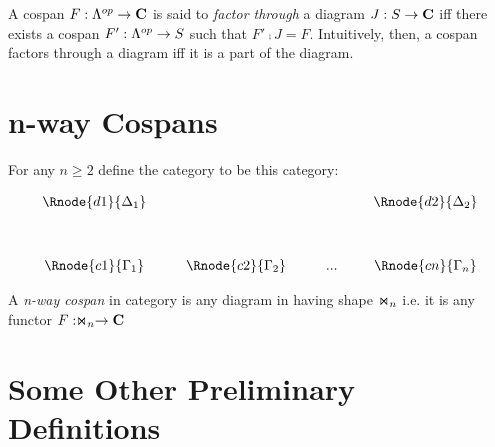 \documentclass[10pt,a4paper]{scrartcl}
\newcommand{\ndidlycospan}{n-way cospan}
\begin{document}
\vspace*{0.3cm}
\noindent
A cospan $F:\Lambda^{op} \rightarrow \textbf{C}$ is said to \textit{factor through}  a diagram 
$J:S \rightarrow \textbf{C}$ iff there exists a cospan $F': \Lambda^{op} \rightarrow S$ 
such that $F' \comp J = F$. Intuitively, then, a cospan factors through a diagram iff it is a 
part of the diagram.
  
\section{n-way Cospans}
\iffalse
The notion of a \textit{higher cospan} was
 introduced in \cite{Grandis2007} for diagrams
in a category of shape $\Lambda^{op^n}$but for us there are significant diagrams whose 
shape category is a quotient of  ${\Lambda^{op}}^n$ and since we are not aware
of further terminology in this area we introduce some here. It is appropriate to make use the join symbol ($\Join$) from relational algebra. \\
\fi

\noindent For any $n \geq 2$ define the category \ndidly to be this category:

\begin{center}
\begin{displaymath}
\begin{array}{cp{0.3cm}c         p{0.3cm}  c p{0.2cm} c}
\Rnode{d1}{\Delta_1}& &               & &     & &\Rnode{d2}{\Delta_2}  \\ [1.2cm]
\Rnode{c1}{\Gamma_1}& &\Rnode{c2}{\Gamma_2}& & ... & &\Rnode{cn}{\Gamma_n}
\end{array}
\end{displaymath}
\end{center}

\begin{definition}
A \textit{\ndidlycospan}
 in category   is any diagram in  having 
shape $\Join_n$  i.e. it is any functor $F: \Join_n \rightarrow \textbf{C}$
\end{definition}

\section{ Some Other Preliminary Definitions}
\end{document}
